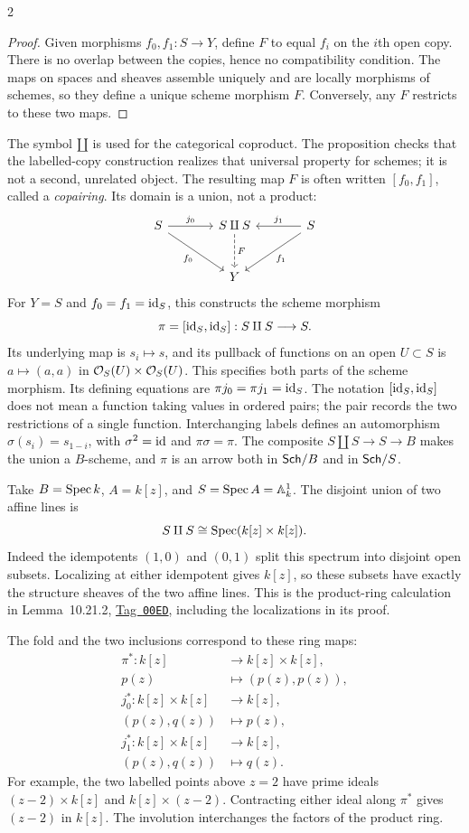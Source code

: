 \documentclass[12pt]{memoir}
\newcommand{\BGtag}[1]{\href{https://stacks.math.columbia.edu/tag/#1}{Tag~\texttt{#1}}}
\begin{document}
\begin{multicols}{2}
\begin{proof}
Given morphisms $f_0,f_1:S\to Y$, define $F$ to equal $f_i$ on the
$i$th open copy. There is no overlap between the copies, hence no
compatibility condition. The maps on spaces and sheaves assemble
uniquely and are locally morphisms of schemes, so they define a unique
scheme morphism $F$. Conversely, any $F$ restricts to these two maps.
\end{proof}

The symbol $\amalg$ is used for the categorical coproduct. The
proposition checks that the labelled-copy construction realizes that
universal property for schemes; it is not a second, unrelated object.
The resulting map $F$ is often written $[f_0,f_1]$, called a
\emph{copairing}. Its domain is a union, not a product:
\[
\begin{tikzcd}[column sep=large,row sep=large]
S \arrow[r,"j_0"] \arrow[dr,"f_0"']
 &S\amalg S \arrow[d,dashed,"F"]
 &S \arrow[l,"j_1"'] \arrow[dl,"f_1"]\\
&Y&
\end{tikzcd}
\]
For $Y=S$ and $f_0=f_1=\operatorname{id}_S$, this constructs the scheme morphism
\[
 \pi=[\operatorname{id}_S,\operatorname{id}_S]:S\amalg S\longrightarrow S.
\]
Its underlying map is $s_i\mapsto s$, and its pullback of functions
on an open $U\subset S$ is $a\mapsto(a,a)$ in
$\mathcal{O}_S(U)\times\mathcal{O}_S(U)$. This specifies both parts of the scheme
morphism. Its defining equations are $\pi j_0=\pi j_1=\operatorname{id}_S$.
The notation $[\operatorname{id}_S,\operatorname{id}_S]$ does not mean a function taking values
in ordered pairs; the pair records the two restrictions of a single
function. Interchanging labels defines an automorphism
$\sigma(s_i)=s_{1-i}$, with $\sigma^2=\operatorname{id}$ and $\pi\sigma=\pi$.
The composite $S\amalg S\to S\to B$ makes the union a $B$-scheme,
and $\pi$ is an arrow both in $\mathsf{Sch}/B$ and in $\mathsf{Sch}/S$.

\begin{Ex}\label{ex:twosheets}
Take $B=\operatorname{Spec} k$, $A=k[z]$, and $S=\operatorname{Spec} A=\mathbb{A}^1_k$.
The disjoint union of two affine lines is
\[
 S\amalg S\cong\operatorname{Spec}(k[z]\times k[z]).
\]
Indeed the idempotents $(1,0)$ and $(0,1)$ split this spectrum into
disjoint open subsets. Localizing at either idempotent gives $k[z]$,
so these subsets have exactly the structure sheaves of the two affine
lines. This is the product-ring calculation in Lemma~10.21.2,
\BGtag{00ED}, including the localizations in its proof.

The fold and the two inclusions correspond to these ring maps:
\[
\begin{aligned}
\pi^*:k[z]&\longrightarrow k[z]\times k[z],\\
p(z)&\longmapsto(p(z),p(z)),\\
j_0^*:k[z]\times k[z]&\longrightarrow k[z],\\
(p(z),q(z))&\longmapsto p(z),\\
j_1^*:k[z]\times k[z]&\longrightarrow k[z],\\
(p(z),q(z))&\longmapsto q(z).
\end{aligned}
\]
For example, the two labelled points above $z=2$ have prime ideals
$(z-2)\times k[z]$ and $k[z]\times(z-2)$. Contracting either ideal
along $\pi^*$ gives $(z-2)$ in $k[z]$. The involution interchanges the
factors of the product ring.


\end{Ex}
\end{multicols}
\end{document}
